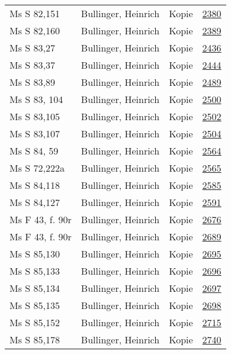\documentclass[10pt,a4paper,landscape]{report}
\begin{document}
\begin{longtable}{p{16cm}p{4cm}lr}
Ms S 82,151	&	Bullinger, Heinrich	&	Kopie	&	\href{http://130.60.24.72/assignment/2380}{2380}\\
Ms S 82,160	&	Bullinger, Heinrich	&	Kopie	&	\href{http://130.60.24.72/assignment/2389}{2389}\\
Ms S 83,27	&	Bullinger, Heinrich	&	Kopie	&	\href{http://130.60.24.72/assignment/2436}{2436}\\
Ms S 83,37	&	Bullinger, Heinrich	&	Kopie	&	\href{http://130.60.24.72/assignment/2444}{2444}\\
Ms S 83,89	&	Bullinger, Heinrich	&	Kopie	&	\href{http://130.60.24.72/assignment/2489}{2489}\\
Ms S 83, 104	&	Bullinger, Heinrich	&	Kopie	&	\href{http://130.60.24.72/assignment/2500}{2500}\\
Ms S 83,105	&	Bullinger, Heinrich	&	Kopie	&	\href{http://130.60.24.72/assignment/2502}{2502}\\
Ms S 83,107	&	Bullinger, Heinrich	&	Kopie	&	\href{http://130.60.24.72/assignment/2504}{2504}\\
Ms S 84, 59	&	Bullinger, Heinrich	&	Kopie	&	\href{http://130.60.24.72/assignment/2564}{2564}\\
Ms S 72,222a	&	Bullinger, Heinrich	&	Kopie	&	\href{http://130.60.24.72/assignment/2565}{2565}\\
Ms S 84,118	&	Bullinger, Heinrich	&	Kopie	&	\href{http://130.60.24.72/assignment/2585}{2585}\\
Ms S 84,127	&	Bullinger, Heinrich	&	Kopie	&	\href{http://130.60.24.72/assignment/2591}{2591}\\
Ms F 43, f. 90r	&	Bullinger, Heinrich	&	Kopie	&	\href{http://130.60.24.72/assignment/2676}{2676}\\
Ms F 43, f. 90r	&	Bullinger, Heinrich	&	Kopie	&	\href{http://130.60.24.72/assignment/2689}{2689}\\
Ms S 85,130	&	Bullinger, Heinrich	&	Kopie	&	\href{http://130.60.24.72/assignment/2695}{2695}\\
Ms S 85,133	&	Bullinger, Heinrich	&	Kopie	&	\href{http://130.60.24.72/assignment/2696}{2696}\\
Ms S 85,134	&	Bullinger, Heinrich	&	Kopie	&	\href{http://130.60.24.72/assignment/2697}{2697}\\
Ms S 85,135	&	Bullinger, Heinrich	&	Kopie	&	\href{http://130.60.24.72/assignment/2698}{2698}\\
Ms S 85,152	&	Bullinger, Heinrich	&	Kopie	&	\href{http://130.60.24.72/assignment/2715}{2715}\\
Ms S 85,178	&	Bullinger, Heinrich	&	Kopie	&	\href{http://130.60.24.72/assignment/2740}{2740}\\

\end{longtable}
\end{document}
